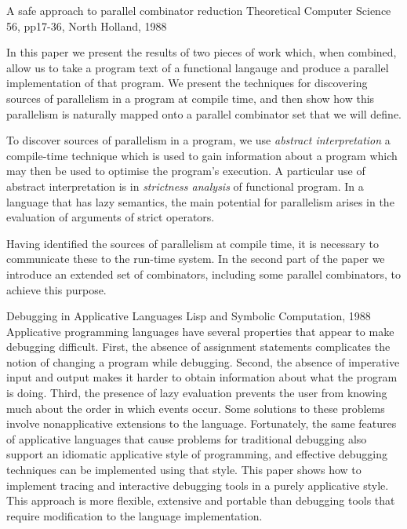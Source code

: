 {A safe approach to parallel combinator reduction}
{Theoretical Computer Science 56, pp17-36, North Holland, 1988}
{
In this paper we present the results of two pieces of work which, when
combined, allow us to take a program text of a functional langauge and
produce a parallel implementation of that program.
We present the techniques for discovering sources of parallelism in 
a program at compile time, and then show how this parallelism is
naturally mapped onto a parallel combinator set that we will define.

To discover sources of parallelism in a program, we use 
{\em abstract interpretation} a compile-time technique which is used
to gain information about a program which may then be used to optimise
the program's execution.
A particular use of abstract interpretation is in 
{\em strictness analysis}
of functional program.
In a language that has lazy semantics, the main potential for parallelism
arises in the evaluation of arguments of strict operators.

Having identified the sources of parallelism at compile time, it is 
necessary to communicate these to the run-time system.
In the second part of the paper we introduce an extended set of combinators,
including some parallel combinators, to achieve this purpose.
}


{Debugging in Applicative Languages}
{Lisp and Symbolic Computation, 1988}
{Applicative programming languages have several properties that appear
to make debugging difficult. First, the absence of assignment
statements complicates the notion of changing a program while
debugging. Second, the absence of imperative input and output
makes it harder to obtain information about what the program is doing.
Third, the presence of lazy evaluation prevents the user from
knowing much about the order in which events occur. Some solutions to
these problems involve nonapplicative extensions to the language.
Fortunately, the same features of applicative languages that cause
problems for traditional debugging also support an idiomatic 
applicative style of programming, and effective debugging techniques
can be implemented using that style. This paper shows how to implement
tracing and interactive debugging tools in a purely applicative
style. This approach is more flexible, extensive and portable
than debugging tools that require modification to the language
implementation.}


